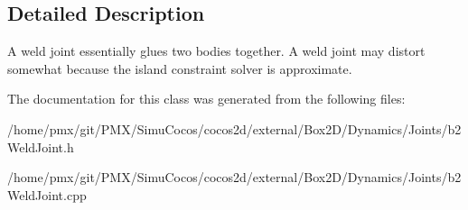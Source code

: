 \subsection{Detailed Description}
A weld joint essentially glues two bodies together. A weld joint may distort somewhat because the island constraint solver is approximate. 

The documentation for this class was generated from the following files\+:\begin{DoxyCompactItemize}
\item 
/home/pmx/git/\+P\+M\+X/\+Simu\+Cocos/cocos2d/external/\+Box2\+D/\+Dynamics/\+Joints/b2\+Weld\+Joint.\+h\item 
/home/pmx/git/\+P\+M\+X/\+Simu\+Cocos/cocos2d/external/\+Box2\+D/\+Dynamics/\+Joints/b2\+Weld\+Joint.\+cpp\end{DoxyCompactItemize}

